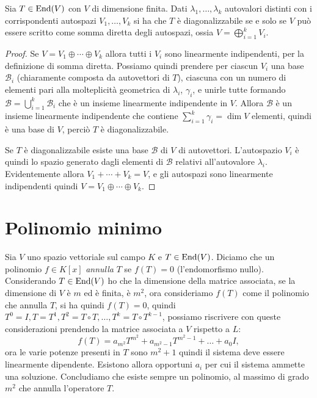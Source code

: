 \begin{teorema}
	Sia $T\in \operatorname{End}(V)$ con $V$ di dimensione finita.
	Dati $\lambda_1,\dots,\lambda_k$ autovalori distinti con i corrispondenti autospazi $V_1,\dots,V_k$ si ha che $T$ è diagonalizzabile se e solo se $V$ può essere scritto come somma diretta degli autospazi, ossia $V=\bigoplus_{i=1}^k V_i$.
\end{teorema}
\begin{proof}
	Se $V=V_1\oplus\cdots\oplus V_k$ allora tutti i $V_i$ sono linearmente indipendenti, per la definizione di somma diretta.
	Possiamo quindi prendere per ciascun $V_i$ una base $\mathcal B_i$ (chiaramente composta da autovettori di $T$), ciascuna con un numero di elementi pari alla molteplicità geometrica di $\lambda_i$, $\gamma_i$, e unirle tutte formando $\mathcal B=\bigcup_{i=1}^k\mathcal B_i$ che è un insieme linearmente indipendente in $V$.
	Allora $\mathcal B$ è un insieme linearmente indipendente che contiene $\sum_{i=1}^k\gamma_i=\dim V$ elementi, quindi è una base di $V$, perciò $T$ è diagonalizzabile.

	Se $T$ è diagonalizzabile esiste una base $\mathcal B$ di $V$ di autovettori.
	L'autospazio $V_i$ è quindi lo spazio generato dagli elementi di $\mathcal B$ relativi all'autovalore $\lambda_i$.
	Evidentemente allora $V_1+\cdots+V_k=V$, e gli autospazi sono linearmente indipendenti quindi $V=V_1\oplus\cdots\oplus V_k$.
\end{proof}

\section{Polinomio minimo}
Sia $V$ uno spazio vettoriale sul campo $K$ e $T\in \operatorname{End}(V)$.
Diciamo che un polinomio $f\in K[x]$ \emph{annulla} $T$ se $f(T) = 0$ (l'endomorfismo nullo).
Considerando $T\in \operatorname{End}(V)$ ho che la dimensione della matrice associata, se la dimensione di $V$ è $m$ ed è finita, è $m^2$, ora consideriamo $f(T)$ come il polinomio che annulla $T$, si ha quindi $f(T) = 0$, quindi $T^0 = I,T=T^1, T^2=T\circ T, \dots, T^k = T\circ T^{k-1}$, possiamo riscrivere con queste considerazioni prendendo la matrice associata a $V$ rispetto a $L$:
\begin{equation*}
	f(T) = a_{m^2}T^{m^2} +a_{m^2-1}T^{m^2-1}+\dots+a_0I,
\end{equation*}
ora le varie potenze presenti in $T$ sono $m^2+1$ quindi il sistema deve essere linearmente dipendente.
Esistono allora opportuni $a_i$ per cui il sistema ammette una soluzione.
Concludiamo che esiste sempre un polinomio, al massimo di grado $m^2$ che annulla l'operatore $T$.

